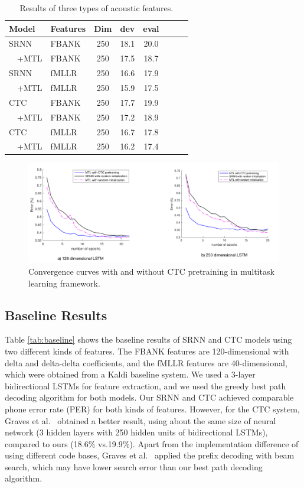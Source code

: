 \documentclass[a4paper]{article}
\begin{document}
\begin{table}
 \centering \small
\caption{Results of three types of acoustic features. }
\label{tab:mtl}
\begin{tabular}{ll|cccccc}
\hline

\hline
Model & Features   & Dim & dev  & eval \\ \hline
SRNN & FBANK & 250 & 18.1 & 20.0 \\
$\quad$+MTL & FBANK& 250 &17.5& 18.7 \\
SRNN & fMLLR & 250 & 16.6 & 17.9 \\
$\quad$+MTL  & fMLLR & 250 & 15.9 & 17.5 \\ \hline
CTC & FBANK & 250 & 17.7 & 19.9\\ 
$\quad$+MTL & FBANK& 250 &  17.2 & 18.9 \\
CTC & fMLLR & 250 & 16.7 & 17.8 \\ 
$\quad$+MTL   & fMLLR & 250 & 16.2 & 17.4 \\ \hline

\hline
\end{tabular}
\vskip-2mm
\end{table}

\begin{figure}[t]
\small
\centerline{\includegraphics[width=1\textwidth]{ictc}} \vskip -2mm
\caption{Convergence curves with and without CTC pretraining in multitask learning framework.}  
\label{fig:ctc-pretrain}
\vskip -2mm
\end{figure}

\subsection{Baseline Results}

Table \ref{tab:baseline} shows the baseline results of SRNN and CTC models using two different kinds of features. The FBANK features are 120-dimensional with delta and delta-delta coefficients, and the fMLLR features are 40-dimensional, which were obtained from a Kaldi baseline system. We used a 3-layer bidirectional LSTMs for feature extraction, and we used the greedy best path decoding algorithm for both models. Our SRNN and CTC achieved comparable phone error rate (PER) for both kinds of features. However, for the CTC system, Graves et al.~\cite{graves2013speech} obtained a better result, using about the same size of neural network (3 hidden layers with 250 hidden units of bidirectional LSTMs), compared to ours (18.6\% vs.19.9\%). Apart from the implementation difference of using different code bases, Graves et al.~\cite{graves2013speech} applied the prefix decoding with beam search, which may have lower search error than our best path decoding algorithm. 
\end{document}
